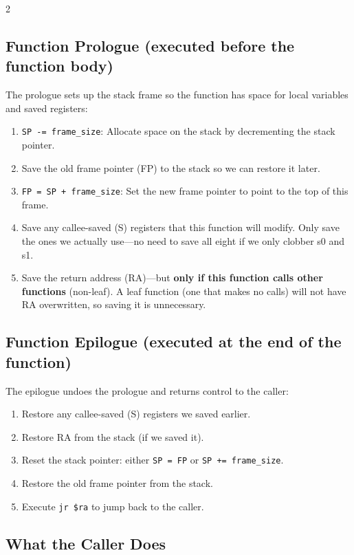 \documentclass[9pt,landscape]{extarticle}
\begin{document}
\begin{multicols}{2}
\subsection{Function Prologue (executed before the function body)}

The prologue sets up the stack frame so the function has space for local variables and saved registers:

\begin{enumerate}
  \item \texttt{SP -= frame\_size}: Allocate space on the stack by decrementing the stack pointer.
  \item Save the old frame pointer (FP) to the stack so we can restore it later.
  \item \texttt{FP = SP + frame\_size}: Set the new frame pointer to point to the top of this frame.
  \item Save any callee-saved (S) registers that this function will modify. Only save the ones we actually use---no need to save all eight if we only clobber s0 and s1.
  \item Save the return address (RA)---but \textbf{only if this function calls other functions} (non-leaf). A leaf function (one that makes no calls) will not have RA overwritten, so saving it is unnecessary.
\end{enumerate}

\subsection{Function Epilogue (executed at the end of the function)}

The epilogue undoes the prologue and returns control to the caller:

\begin{enumerate}
  \item Restore any callee-saved (S) registers we saved earlier.
  \item Restore RA from the stack (if we saved it).
  \item Reset the stack pointer: either \texttt{SP = FP} or \texttt{SP += frame\_size}.
  \item Restore the old frame pointer from the stack.
  \item Execute \texttt{jr \$ra} to jump back to the caller.
\end{enumerate}

\subsection{What the Caller Does}


\end{multicols}
\end{document}
